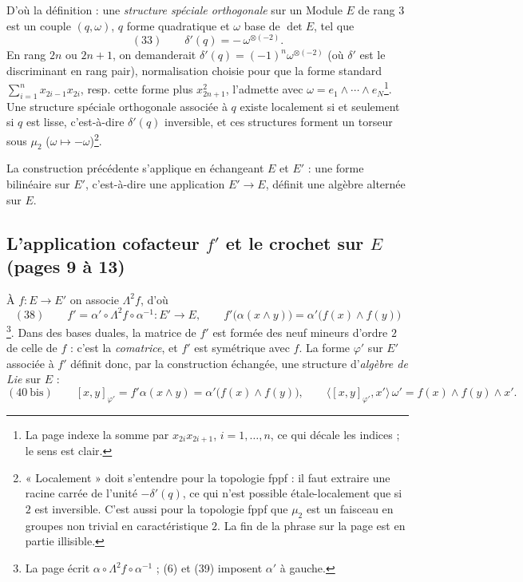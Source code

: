 \documentclass[11pt,a4paper]{article}
\begin{document}
D'où la définition : une \emph{structure spéciale orthogonale} sur un Module $E$
de rang $3$ est un couple $(q, \omega)$, $q$ forme quadratique et $\omega$ base de
$\det E$, tel que
\[
  (33) \qquad \delta'(q) = -\,\omega^{\otimes(-2)} .
\]
En rang $2n$ ou $2n + 1$, on demanderait $\delta'(q) = (-1)^n \omega^{\otimes(-2)}$
(où $\delta'$ est le discriminant en rang pair), normalisation choisie pour que la
forme standard $\sum_{i=1}^{n} x_{2i-1}x_{2i}$, resp. cette forme plus
$x_{2n+1}^2$, l'admette avec $\omega = e_1 \wedge \cdots \wedge e_N$\footnote{La page
indexe la somme par $x_{2i}x_{2i+1}$, $i = 1, \ldots, n$, ce qui décale les indices ;
le sens est clair.}. Une structure spéciale orthogonale associée à $q$ existe
localement si et seulement si $q$ est lisse, c'est-à-dire $\delta'(q)$ inversible,
et ces structures forment un torseur sous $\mu_2$ ($\omega \mapsto -\omega$)\footnote{
« Localement » doit s'entendre pour la topologie fppf : il faut extraire une
racine carrée de l'unité $-\delta'(q)$, ce qui n'est possible étale-localement
que si $2$ est inversible. C'est aussi pour la topologie fppf que $\mu_2$ est
un faisceau en groupes non trivial en caractéristique $2$. La fin de la phrase
sur la page est en partie illisible.}.

La construction précédente s'applique en échangeant $E$ et $E'$ : une forme
bilinéaire sur $E'$, c'est-à-dire une application $E' \to E$, définit une algèbre
alternée sur $E$.

\subsection*{L'application cofacteur $f'$ et le crochet sur $E$ (pages 9 à 13)}

À $f : E \to E'$ on associe $\Lambda^2 f$, d'où
\[
  (38) \qquad f' = \alpha' \circ \Lambda^2 f \circ \alpha^{-1} : E' \longrightarrow E ,
  \qquad f'\bigl(\alpha(x \wedge y)\bigr) = \alpha'\bigl(f(x) \wedge f(y)\bigr)
\]
\footnote{La page écrit $\alpha \circ \Lambda^2 f \circ \alpha^{-1}$ ; (6) et (39) imposent
$\alpha'$ à gauche.}. Dans des bases duales, la matrice de $f'$ est formée des
neuf mineurs d'ordre $2$ de celle de $f$ : c'est la \emph{comatrice}, et $f'$ est
symétrique avec $f$. La forme $\varphi'$ sur $E'$ associée à $f'$ définit donc,
par la construction échangée, une structure d'\emph{algèbre de Lie} sur $E$ :
\[
  (40\ \text{bis}) \qquad [x, y]_{\varphi'} = f'\alpha(x \wedge y) = \alpha'\bigl(f(x) \wedge f(y)\bigr),
  \qquad \bigl\langle [x, y]_{\varphi'}, x' \bigr\rangle\, \omega' = f(x) \wedge f(y) \wedge x' .
\]
\end{document}
